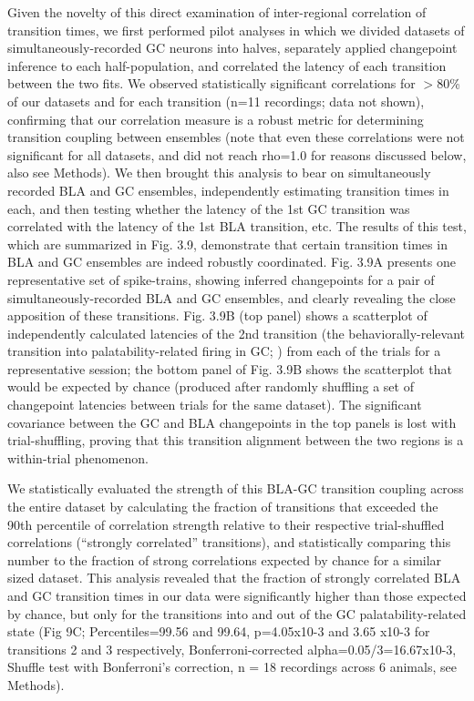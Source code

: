 \begin{refsection}
Given the novelty of this direct examination of inter-regional correlation of transition times, we first performed pilot analyses in which we divided datasets of simultaneously-recorded GC neurons into halves, separately applied changepoint inference to each half-population, and correlated the latency of each transition between the two fits. We observed statistically significant correlations for \(>\)80\% of our datasets and for each transition (n=11 recordings; data not shown), confirming that our correlation measure is a robust metric for determining transition coupling between ensembles (note that even these correlations were not significant for all datasets, and did not reach rho=1.0 for reasons discussed below, also see Methods). 
We then brought this analysis to bear on simultaneously recorded BLA and GC ensembles, independently estimating transition times in each, and then testing whether the latency of the 1st GC transition was correlated with the latency of the 1st BLA transition, etc. The results of this test, which are summarized in Fig. 3.9, demonstrate that certain transition times in BLA and GC ensembles are indeed robustly coordinated. Fig. 3.9A presents one representative set of spike-trains, showing inferred changepoints for a pair of simultaneously-recorded BLA and GC ensembles, and clearly revealing the close apposition of these transitions. Fig. 3.9B (top panel) shows a scatterplot of independently calculated latencies of the 2nd transition (the behaviorally-relevant transition into palatability-related firing in GC; \cite{sadacca2016a,mukherjee2019a}) from each of the trials for a representative session; the bottom panel of Fig. 3.9B shows the scatterplot that would be expected by chance (produced after randomly shuffling a set of changepoint latencies between trials for the same dataset). The significant covariance between the GC and BLA changepoints in the top panels is lost with trial-shuffling, proving that this transition alignment between the two regions is a within-trial phenomenon.

We statistically evaluated the strength of this BLA-GC transition coupling across the entire dataset by calculating the fraction of transitions that exceeded the 90th percentile of correlation strength relative to their respective trial-shuffled correlations (“strongly correlated” transitions), and statistically comparing this number to the fraction of strong correlations expected by chance for a similar sized dataset. This analysis revealed that the fraction of strongly correlated BLA and GC transition times in our data were significantly higher than those expected by chance, but only for the transitions into and out of the GC palatability-related state (Fig 9C; Percentiles=99.56 and 99.64, p=4.05x10-3 and 3.65 x10-3 for transitions 2 and 3 respectively, Bonferroni-corrected alpha=0.05/3=16.67x10-3, Shuffle test with Bonferroni’s correction, n = 18 recordings across 6 animals, see Methods). 


\end{refsection}
